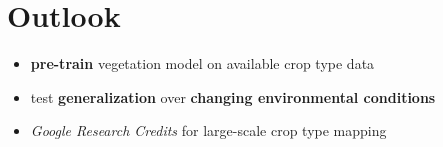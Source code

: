 \documentclass[a0]{tumposter}
\begin{document}
\begin{minipage}[t]{0.32\textwidth}
%	

	
%	
	
%	
%			
%	
%
%	
%	
%	
%	 
%	 
	 \section{Outlook}
%	 
%	 	
	 	\begin{itemize}
	 		\item \textbf{pre-train} vegetation model on available crop type data
	 		\item test \textbf{generalization} over \textbf{changing environmental conditions}
	 		\item \textit{Google Research Credits} for large-scale crop type mapping  
	 	\end{itemize}
	 	

\end{minipage}
\end{document}
